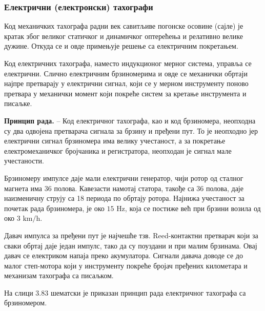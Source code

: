 \documentclass[12pt,a4paper]{report}
\begin{document}

\subsubsection{Електрични (електронски) тахографи}

Код механичких тахографа радни век савитљиве погонске осовине (сајле) је кратак због великог статичког и динамичког оптерећења и релативно велике дужине. Откуда се и овде примењује решење са електричним покретањем.

Код електричних тахографа, наместо индукционог мерног система, управља се електрични. Слично електричним брзиномерима и овде се
механички обртаји најпре претварају у електрични сигнал, који се у мерном инструменту поново претвара у механички момент који покреће систем за кретање инструмента и писаљке.

\textbf{Принцип рада.} – Код електричног тахографа, као и код брзиномера, неопходна су два одвојена претварача сигнала за брзину и пређени пут. То је неопходно јер електрични сигнал брзиномера има велику учестаност, а за покретање електромеханичког бројчаника и регистратора, неопходан је сигнал мале учестаности.

Брзиномеру импулсе даје мали електрични генератор, чији ротор од сталног магнета има 36 полова. Кавезасти намотај статора, такође са 36 полова, даје наизменичну струју са 18 периода по обртају ротора. Најнижа учестаност за почетак рада брзиномера, је око $15\text{ Hz}$, која се постиже већ при брзини возила од око $3\text{ km/h}$.

Давач импулса за пређени пут је најчешће тзв. Reed-контактни претварач који за сваки обртај даје један импулс, тако да су поуздани и при малим брзинама. Овај давач се електриком напаја преко акумулатора. Сигнали давача доводе се до малог степ-мотора који у инструменту покреће бројач пређених километара и механизам тахографа са писаљком.

На слици 3.83 шематски је приказан принцип рада електричног тахографа са брзиномером.

\end{document}
